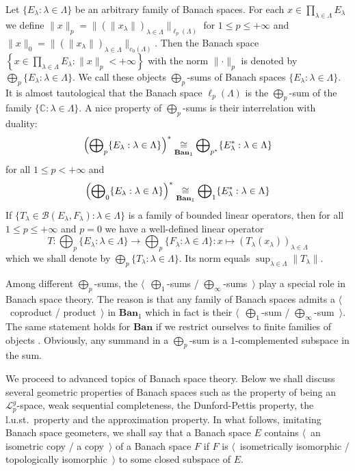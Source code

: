 Let $ \{E_\lambda:\lambda\in\Lambda \}$ be an arbitrary family of Banach spaces.
For each $x\in \prod_{\lambda\in\Lambda} E_\lambda$ we define 
$\lVert x\rVert_p
=\lVert{
  (\rVert x_\lambda\lVert)}_{\lambda\in\Lambda}
\rVert_{\ell_p(\Lambda)}$
for $1\leq p\leq +\infty$ and 
$\lVert x\rVert_0
=\lVert
  {(\rVert x_\lambda\lVert)}_{\lambda\in\Lambda}
\rVert_{c_0(\Lambda)}$. 
Then the Banach space
$\left \{
  x\in \prod_{\lambda\in\Lambda} E_\lambda
  :\lVert x\rVert_p<+\infty
\right \}$ 
with the norm $\lVert\cdot\rVert_p$ is denoted by $\bigoplus_p
\{E_\lambda:\lambda\in\Lambda \}$. We call these objects $\bigoplus_p$-sums of
Banach spaces $ \{E_\lambda:\lambda\in\Lambda \}$. It is almost tautological
that the Banach space $\ell_p(\Lambda)$ is the $\bigoplus_p$-sum of the family $
\{\mathbb{C}:\lambda\in\Lambda \}$. A nice property of $\bigoplus_p$-sums is
their interrelation with duality:
\[
{\left(\bigoplus\nolimits_p \{E_\lambda:\lambda\in\Lambda \}\right)}^*
\mathrel{\mathop{\cong}\limits_{\mathbf{Ban}_1}}
\bigoplus\nolimits_{p^*} \{E_\lambda^*:\lambda\in\Lambda \}
\]
for all $1\leq p<+\infty$ and 
\[
{\left(\bigoplus\nolimits_0 \{E_\lambda:\lambda\in\Lambda \}\right)}^*
\mathrel{\mathop{\cong}\limits_{\mathbf{Ban}_1}}
\bigoplus\nolimits_1 \{E_\lambda^*:\lambda\in\Lambda \}
\]
If $ \{T_\lambda\in\mathcal{B}(E_\lambda, F_\lambda):\lambda\in\Lambda \}$ is a
family of bounded linear operators, then for all $1\leq p\leq+\infty$ and $p=0$
we have a well-defined linear operator
\[
T:\bigoplus\nolimits_p \{E_\lambda:\lambda\in\Lambda \}
  \to 
\bigoplus\nolimits_p \{ F_\lambda:\lambda\in\Lambda \}
:x\mapsto {(T_\lambda(x_\lambda))}_{\lambda\in\Lambda}
\]
which we shall denote by $\bigoplus_p \{T_\lambda:\lambda\in\Lambda \}$. Its
norm equals $\sup_{\lambda\in\Lambda}\lVert T_\lambda\rVert$.

Among different $\bigoplus_p$-sums, the $\langle$~$\bigoplus_1$-sums /
$\bigoplus_\infty$-sums~$\rangle$ play a special role in Banach space theory.
The reason is that any family of Banach spaces admits a $\langle$~coproduct /
product~$\rangle$ in $\mathbf{Ban}_1$ which in fact is their
$\langle$~$\bigoplus_1$-sum / $\bigoplus_\infty$-sum~$\rangle$. The same
statement holds for $\mathbf{Ban}$ if we restrict ourselves to finite families
of objects \cite[chapter 2, section 5]{HelLectAndExOnFuncAn}. Obviously, any 
summand in a $\bigoplus_p$-sum is a $1$-complemented subspace in the sum.

We proceed to advanced topics of Banach space theory. Below we shall discuss
several geometric properties of Banach spaces such as the property of being an
$\mathscr{L}_p^g$-space, weak sequential completeness, the Dunford-Pettis
property, the l.u.st.\ property and the approximation property. In what follows,
imitating Banach space geometers, we shall say that a Banach space $E$ contains
$\langle$~an isometric copy / a copy~$\rangle$ of a Banach space $F$ if $F$ is
$\langle$~isometrically isomorphic / topologically isomorphic~$\rangle$ to some
closed subspace of $E$. 

